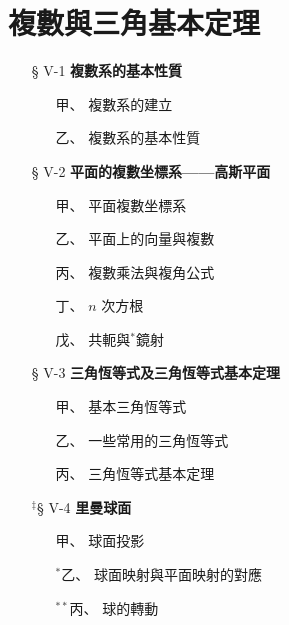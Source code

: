 
\section{複數與三角基本定理}
\label{sec:b4-ch5}

\begin{center}
\begin{minipage}{0.75\textwidth}
\begin{itemize}[leftmargin=2em, itemsep=0.3em]
  \item[§ V-1] \textbf{複數系的基本性質}
  \begin{itemize}[leftmargin=2em, itemsep=0.2em]
    \item[甲、] 複數系的建立
    \item[乙、] 複數系的基本性質
  \end{itemize}
  \item[§ V-2] \textbf{平面的複數坐標系——高斯平面}
  \begin{itemize}[leftmargin=2em, itemsep=0.2em]
    \item[甲、] 平面複數坐標系
    \item[乙、] 平面上的向量與複數
    \item[丙、] 複數乘法與複角公式
    \item[丁、] $n$ 次方根
    \item[戊、] 共軛與$^*$鏡射
  \end{itemize}
  \item[§ V-3] \textbf{三角恆等式及三角恆等式基本定理}
  \begin{itemize}[leftmargin=2em, itemsep=0.2em]
    \item[甲、] 基本三角恆等式
    \item[乙、] 一些常用的三角恆等式
    \item[丙、] 三角恆等式基本定理
  \end{itemize}
  \item[${}^\ddagger$§ V-4] \textbf{里曼球面}
  \begin{itemize}[leftmargin=2em, itemsep=0.2em]
    \item[甲、] 球面投影
    \item[$^*$乙、] 球面映射與平面映射的對應
    \item[$^{**}$丙、] 球的轉動
  \end{itemize}
\end{itemize}
\end{minipage}
\end{center}

